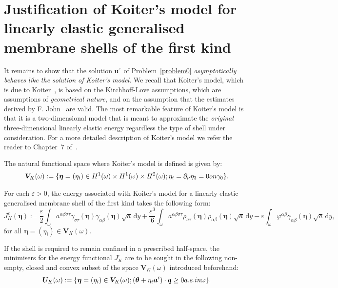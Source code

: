 \documentclass{amsart}
\def\dd{\, \mathrm{d}}
\begin{document}
\section{Justification of Koiter's model for linearly elastic generalised membrane shells of the first kind}
\label{Sec:5}

It remains to show that the solution $\bm{u}^\varepsilon$ of Problem~\ref{problem0} \emph{asymptotically behaves like the solution of Koiter's model}. We recall that Koiter's model, which is due to Koiter~\cite{Koiter,Koiter1970}, is based on the Kirchhoff-Love assumptions, which are assumptions of \emph{geometrical nature}, and on the assumption that the estimates derived by F. John~\cite{John1965,John1971} are valid. The most remarkable feature of Koiter's model is that it is a two-dimensional model that is meant to approximate the \emph{original} three-dimensional linearly elastic energy regardless the type of shell under consideration.
For a more detailed description of Koiter's model we refer the reader to Chapter~7 of~\cite{Ciarlet2000}.

The natural functional space where Koiter's model is defined is given by:
\begin{equation*}
	\bm{V}_K(\omega):=\{\bm{\eta}=(\eta_i) \in H^1(\omega) \times H^1(\omega) \times H^2(\omega); \eta_i=\partial_{\nu}\eta_3=0 \textup{ on }\gamma_0\}.
\end{equation*}

For each $\varepsilon>0$, the energy associated with Koiter's model for a linearly elastic generalised membrane shell of the first kind takes the following form:
\begin{equation*}
	J_K^\varepsilon(\bm{\eta}):=\dfrac{\varepsilon}{2}\int_{\omega} a^{\alpha\beta\sigma\tau} \gamma_{\sigma\tau}(\bm{\eta}) \gamma_{\alpha\beta}(\bm{\eta}) \sqrt{a} \dd y +\dfrac{\varepsilon^3}{6}\int_{\omega}a^{\alpha\beta\sigma\tau} \rho_{\sigma\tau}(\bm{\eta})\rho_{\alpha\beta}(\bm{\eta}) \sqrt{a} \dd y -\varepsilon\int_{\omega} \varphi^{\alpha\beta} \gamma_{\alpha\beta}(\bm{\eta}) \sqrt{a} \dd y,
\end{equation*}
for all $\bm{\eta}=(\eta_i) \in \bm{V}_K(\omega)$.

If the shell is required to remain confined in a prescribed half-space, the minimisers for the energy functional $J_K^\varepsilon$ are to be sought in the following non-empty, closed and convex subset of the space $\bm{V}_K(\omega)$ introduced beforehand:
\begin{equation*}
	\bm{U}_K(\omega):=\{\bm{\eta}=(\eta_i)\in \bm{V}_K(\omega); (\bm{\theta}+\eta_i \bm{a}^i)\cdot\bm{q}\ge 0 \textup{ a.e. in }\omega\}.
\end{equation*}
\end{document}
